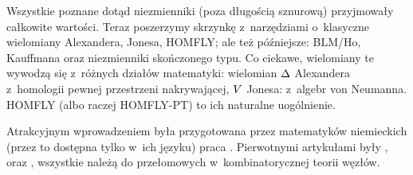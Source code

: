 
Wszystkie poznane dotąd niezmienniki (poza długością sznurową) przyjmowały całkowite wartości.
Teraz poszerzymy skrzynkę z~narzędziami o~klasyczne wielomiany Alexandera, Jonesa, HOMFLY; ale też późniejsze: BLM/Ho, Kauffmana oraz niezmienniki skończonego typu.
Co ciekawe, wielomiany te wywodzą się z~różnych działów matematyki: wielomian $\Delta$ Alexandera z~homologii pewnej przestrzeni nakrywającej, $V$ Jonesa: z~algebr von Neumanna.
HOMFLY (albo raczej HOMFLY-PT) to ich naturalne uogólnienie.

Atrakcyjnym wprowadzeniem była przygotowana przez matematyków niemieckich (przez to dostępna tylko w~ich języku) praca \cite{gellert2009}.
Pierwotnymi artykułami były \cite{alexander1928}, \cite{jones1985} oraz \cite{homfly1985}, wszystkie należą do przełomowych w~kombinatorycznej teorii węzłów.

